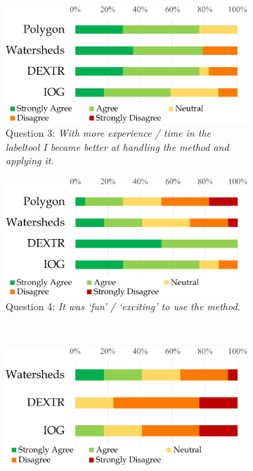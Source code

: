 \begin{figure}
\begin{subfigure}[t]{0.48\textwidth}
{		} \label{fig:ch5:sec4:q2}
	\end{subfigure}
	\\
	\begin{subfigure}[t]{0.48\textwidth}
		\centering
		\includegraphics[width=\textwidth]{figures/chap54_q3.png}
		\caption{
			Question 3: \textit{With more experience / time in the labeltool I became better at handling the method and applying it.}
		} \label{fig:ch5:sec4:q3}
	\end{subfigure}
	\hfill
	\begin{subfigure}[t]{0.48\textwidth}
		\centering
		\includegraphics[width=\textwidth]{figures/chap54_q5.png}
		\caption{
			Question 4: \textit{It was ‘fun’ / ‘exciting’ to use the method.}
		} \label{fig:ch5:sec4:q4}
	\end{subfigure}
	\\
	\begin{subfigure}[t]{0.48\textwidth}
		\centering
		\includegraphics[width=\textwidth]{figures/chap54_q4.png}

\end{subfigure}
\end{figure}
